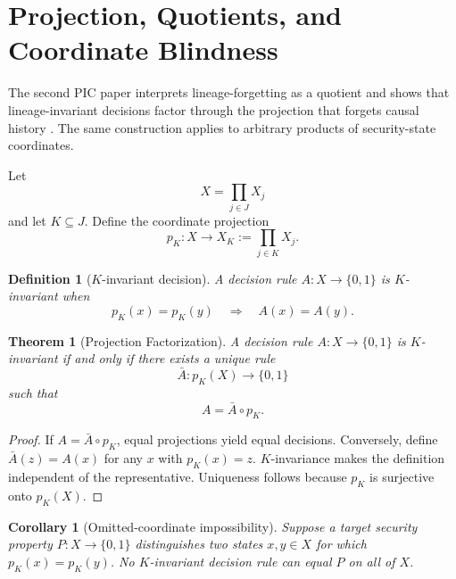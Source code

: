 \documentclass[10pt,twocolumn]{article}
\newtheorem{definition}{Definition}
\newtheorem{theorem}{Theorem}
\newtheorem{corollary}{Corollary}
\begin{document}
\section{Projection, Quotients, and Coordinate Blindness}

The second PIC paper interprets lineage-forgetting as a quotient and shows that
lineage-invariant decisions factor through the projection that forgets causal
history \cite{gallo_relational2026}.  The same construction applies to arbitrary
products of security-state coordinates.

Let
\begin{equation}
  X=\prod_{j\in J}X_j
\end{equation}
and let $K\subseteq J$.  Define the coordinate projection
\begin{equation}
  p_K:X\to X_K:=\prod_{j\in K}X_j.
\end{equation}

\begin{definition}[$K$-invariant decision]
A decision rule $A:X\to\{0,1\}$ is $K$-invariant when
\begin{equation}
  p_K(x)=p_K(y)
  \quad\Longrightarrow\quad
  A(x)=A(y).
\end{equation}
\end{definition}

\begin{theorem}[Projection Factorization]
A decision rule $A:X\to\{0,1\}$ is $K$-invariant if and only if there exists a
unique rule
\begin{equation}
  \bar A:p_K(X)\to\{0,1\}
\end{equation}
such that
\begin{equation}
  A=\bar A\circ p_K.
  \label{eq:factorization}
\end{equation}
\end{theorem}

\begin{proof}
If $A=\bar A\circ p_K$, equal projections yield equal decisions.  Conversely,
define $\bar A(z)=A(x)$ for any $x$ with $p_K(x)=z$.  $K$-invariance makes the
definition independent of the representative.  Uniqueness follows because
$p_K$ is surjective onto $p_K(X)$.
\end{proof}

\begin{corollary}[Omitted-coordinate impossibility]
Suppose a target security property $P:X\to\{0,1\}$ distinguishes two states
$x,y\in X$ for which $p_K(x)=p_K(y)$.  No $K$-invariant decision rule can equal
$P$ on all of $X$.
\end{corollary}
\end{document}

